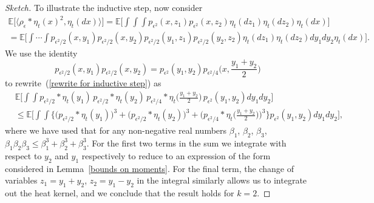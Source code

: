 \documentclass[EJP]{ejpecp} %
\newcommand{\IE}{\mathbb E}
\begin{document}
\begin{proof}[Sketch]
To illustrate the inductive step, now consider
\begin{multline}
\label{rewrite for inductive step}
\IE\big[\langle \rho_\epsilon*\eta_t(x)^2,\eta_t(dx)\rangle\big] 
=
\IE\Big[\int\int\int p_{\epsilon^2}(x,z_1) p_{\epsilon^2}(x,z_2)
\eta_t(dz_1)\eta_t(dz_2)\eta_t(dx)\Big]
\\
=
\IE\Big[\int\cdots\int p_{\epsilon^2/2}(x,y_1) 
p_{\epsilon^2/2}(x,y_2)p_{\epsilon^2/2}(y_1,z_1)
p_{\epsilon^2/2}(y_2,z_2)
\eta_t(dz_1)\eta_t(dz_2)dy_1dy_2\eta_t(dx)\Big].
\end{multline}
We use the identity
\[
p_{\epsilon^2/2}(x,y_1) p_{\epsilon^2/2}(x,y_2)
=p_{\epsilon^2}(y_1,y_2)p_{\epsilon^2/4}\Big(x, \frac{y_1+y_2}{2}\Big)
\]
to rewrite~(\ref{rewrite for inductive step}) as
\begin{align*}
&\IE\Big[\int \int p_{\epsilon^2/2}*\eta_t(y_1)\, p_{\epsilon^2/2}*\eta_t(y_2)\,
p_{\epsilon^2/4}*\eta_t\big(\frac{y_1+y_2}{2}\big)\, 
p_{\epsilon^2}(y_1,y_2)dy_1dy_2\Big]
\\
&\leq 
\IE\Big[\int \int\Big\{
\big(p_{\epsilon^2/2}*\eta_t(y_1)\big)^3+ \big(p_{\epsilon^2/2}*\eta_t(y_2)\big)^3+
\big(p_{\epsilon^2/4}*\eta_t\big(\frac{y_1+y_2}{2}\big)\big)^3
\Big\}p_{\epsilon^2}(y_1,y_2)dy_1dy_2\Big],
\end{align*}
where we have used that for any non-negative real numbers
$\beta_1$, $\beta_2$, $\beta_3$, 
$\beta_1\beta_2\beta_3\leq \beta_1^3+\beta_2^3+\beta_3^3$.
For the first two terms in the sum we integrate with respect to $y_2$ and $y_1$
respectively to reduce to an expression of the form considered in 
Lemma~\ref{bounds on moments}. For the final term, the change of variables
$z_1=y_1+y_2$, $z_2=y_1-y_2$ in the integral similarly 
allows us to integrate out the heat kernel, and we conclude that the result
holds for $k=2$.


\end{proof}
\end{document}
